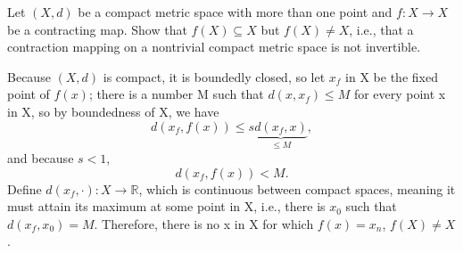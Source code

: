 \documentclass[../fractals_everywhere.tex]{subfiles}
\begin{document}
\begin{example}
	Let \((X, d)\) be a compact metric space with more than one point and \(f:X\rightarrow X\) be a contracting map. Show that \(f(X)\subseteq X\) but \(f(X)\neq X\), i.e., that a contraction mapping on a nontrivial compact metric space is not invertible.

	Because \((X, d)\) is compact, it is boundedly closed, so let \(x_{f}\) in X be the fixed point of \(f(x)\); there is a number M such that \(d(x, x_f) \leq M\) for every point x in X, so by boundedness of X, we have
	\[
		d(x_{f}, f(x))\leq s \underbrace{d(x_{f}, x)}_{\leq M},
	\]
	and because \(s<1\),
	\[
		d(x_f, f(x))<M.
	\]
	Define \(d(x_{f}, \cdot ):X\rightarrow \mathbb{R}\), which is continuous between compact spaces, meaning it must attain its maximum at some point in X, i.e., there is \(x_{0}\) such that \(d(x_{f}, x_{0}) = M\). Therefore, there is no x in X for which \(f(x) = x_{n}\), \(f(X)\neq X\).
\end{example}
\end{document}
